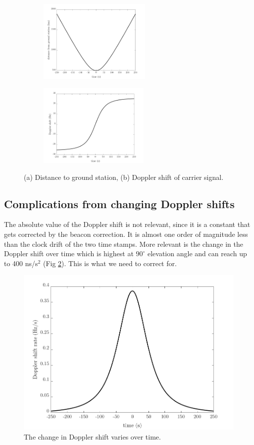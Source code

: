 \begin{figure}[ht!]
	\centering
	\begin{subfigure}[t]{0.45\linewidth}
		\centering
		\includegraphics[height=4cm]{assets/distance.png}
		\subcaption{}
	\end{subfigure}
	\begin{subfigure}[t]{0.45\textwidth}
		\centering
		\includegraphics[height=4cm]{assets/doppler_shift.png}
		\subcaption{}
	\end{subfigure}
\caption{(a) Distance to ground station, (b) Doppler shift of carrier signal.}
\label{fig:doppler_shift}
\end{figure}

\subsection{Complications from changing Doppler shifts} 
The absolute value of the Doppler shift is not relevant, since it is a constant that gets corrected by the beacon correction. It is almost one order of magnitude less than the clock drift of the two time stamps. More relevant is the change in the Doppler shift over time which is highest at $90^\circ$ elevation angle and can reach up to 400 ns/s$^2$ (Fig \ref{fig:doppler_shift_rate}). This is what we need to correct for.

\begin{figure}[ht!]
	\centering
	\includegraphics[width=0.85\linewidth]{assets/doppler_shift_rate.png}
	\caption{The change in Doppler shift varies over time.}
	\label{fig:doppler_shift_rate}
\end{figure}

